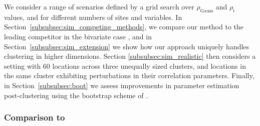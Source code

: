 \documentclass[
  12pt]{article}
\newcommand{\rhou}[1]{\rho_{\text{#1}}}
\begin{document}
We consider a range of scenarios defined by a grid search over $\rhou{Gauss}$ and $\rhou{t}$ values, and for different numbers of sites and variables. 
In Section~\ref{subsubsec:sim_competing_methods}, we compare our method to the leading competitor in the bivariate case \citep{Vignotto2021}, and in Section~\ref{subsubsec:sim_extension} we show how our approach uniquely handles clustering in higher dimensions.
Section \ref{subsubsec:sim_realistic} then considers a setting with 60 locations across three unequally sized clusters, and locations in the same cluster exhibiting perturbations in their correlation parameters.
Finally, in Section~\ref{subsubsec:boot} we assess improvements in parameter estimation post-clustering using the bootstrap scheme of \citet{Heffernan2004}.  

\subsubsection{Comparison to \citet{Vignotto2021}}~\label{subsubsec:sim_competing_methods}
\end{document}
